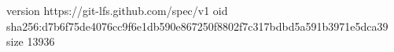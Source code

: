 version https://git-lfs.github.com/spec/v1
oid sha256:d7b6f75de4076cc9f6e1db590e867250f8802f7c317bdbd5a591b3971e5dca39
size 13936
